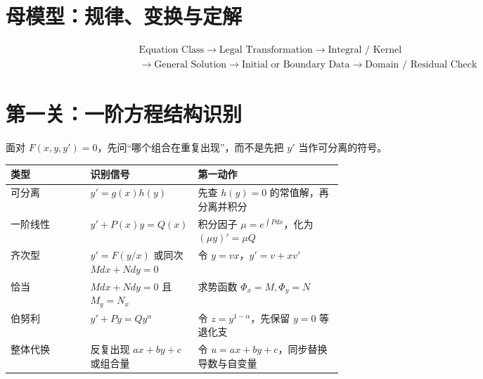 \documentclass[11pt,a4paper,fontset=fandol]{ctexart}
\begin{document}
\section{母模型：规律、变换与定解}
\[
\boxed{\begin{gathered}
\text{Equation Class}\to\text{Legal Transformation}\to\text{Integral / Kernel}\\
\to\text{General Solution}\to\text{Initial or Boundary Data}\to\text{Domain / Residual Check}
\end{gathered}}
\]
\begin{center}
\end{center}

\section{第一关：一阶方程结构识别}
面对 $F(x,y,y')=0$，先问“哪个组合在重复出现”，而不是先把 $y'$ 当作可分离的符号。

\begin{tabularx}{\linewidth}{L{0.24\linewidth}L{0.31\linewidth}Y}
\toprule
类型 & 识别信号 & 第一动作 \\
\midrule
可分离 & $y'=g(x)h(y)$ & 先查 $h(y)=0$ 的常值解，再分离并积分 \\
一阶线性 & $y'+P(x)y=Q(x)$ & 积分因子 $\mu=e^{\int Pdx}$，化为 $(\mu y)'=\mu Q$ \\
齐次型 & $y'=F(y/x)$ 或同次 $Mdx+Ndy=0$ & 令 $y=vx$，$y'=v+xv'$ \\
恰当 & $Mdx+Ndy=0$ 且 $M_y=N_x$ & 求势函数 $\Phi_x=M,\Phi_y=N$ \\
伯努利 & $y'+Py=Qy^\alpha$ & 令 $z=y^{1-\alpha}$，先保留 $y=0$ 等退化支 \\
整体代换 & 反复出现 $ax+by+c$ 或组合量 & 令 $u=ax+by+c$，同步替换导数与自变量 \\
\bottomrule
\end{tabularx}
\end{document}
